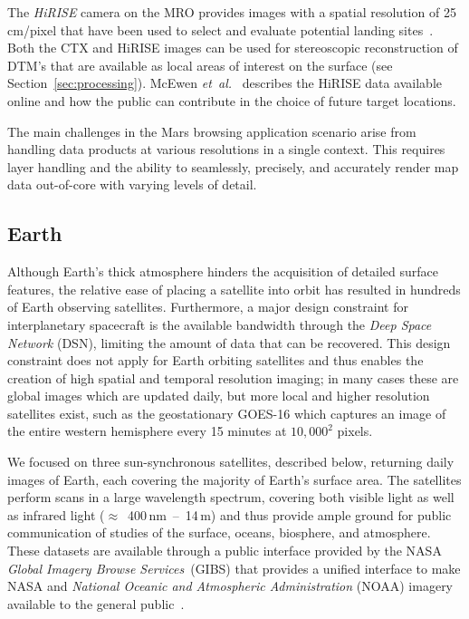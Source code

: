 \documentclass[journal]{vgtc}                %
\newcommand{\kallecomment}[1]{\textbf{[-Kalle-~}
    \textcolor{orange}{#1}
    \textbf{~]}}
\newcommand{\plgrem}[1]{\textcolor{blue}{~\textbf{!!}~}}
\newcommand{\etal}{\emph{et~al.}}
\begin{document}

The \emph{HiRISE} camera on the MRO provides images with a spatial resolution of 25\,cm/pixel that have been used to select and evaluate potential landing sites~\cite{mcewen2007mars}.
Both the CTX and HiRISE images can be used for stereoscopic reconstruction of DTM's that are available as local areas of interest on the surface (see Section~\ref{sec:processing}).
McEwen \etal~\cite{mcewen2016people} describes the HiRISE data available online and how the public can contribute in the choice of future target locations.

The main challenges in the Mars browsing application scenario arise from handling data products at various resolutions in a single context.
This requires layer handling and the ability to seamlessly, precisely, and accurately render map data out-of-core with varying levels of detail.

\subsection{Earth} \label{sec:scenario:earth}
Although Earth's thick atmosphere hinders the acquisition of detailed surface features, the relative ease of placing a satellite into orbit has resulted in hundreds of Earth observing satellites.
Furthermore, a major design constraint for interplanetary spacecraft is the available bandwidth through the \emph{Deep Space Network} (DSN), limiting the amount of data that can be recovered.
This design constraint does not apply for Earth orbiting satellites and thus enables the creation of high spatial and temporal resolution imaging; in many cases these are global images which are updated daily, but more local and higher resolution satellites exist, such as the geostationary GOES-16 which captures an image of the entire western hemisphere every 15 minutes at $10,000^2$ pixels.

We focused on three sun-synchronous satellites, described below, returning daily images of Earth, each covering the majority of Earth's surface area.
The satellites perform scans in a large wavelength spectrum, covering both visible light as well as infrared light ($\approx$~400\,nm~--~14\,\textmu m) and thus provide ample ground for public communication of studies of the surface, oceans, biosphere, and atmosphere.
These datasets are available through a public interface provided by the NASA \emph{Global Imagery Browse Services}~(GIBS) that provides a unified interface to make NASA and \emph{National Oceanic and Atmospheric Administration} (NOAA) imagery available to the general public~\cite{cechini2013expanding}.
\end{document}

